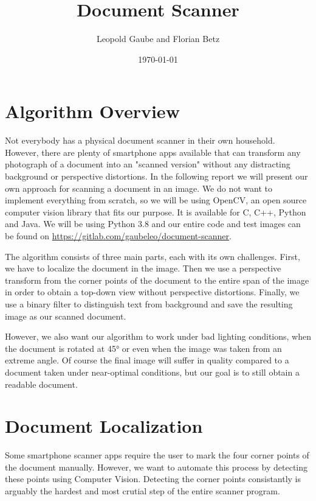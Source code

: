 \documentclass[bibliography=totoc]{scrartcl}
\title{Document Scanner}
\author{Leopold Gaube and Florian Betz}
\date{\today}
\begin{document}
	\maketitle
	\tableofcontents

	\clearpage	

    \section{Algorithm Overview}
	Not everybody has a physical document scanner in their own household. 
	However, there are plenty of smartphone apps available that can transform any photograph of a document into an "scanned version" without any distracting background or perspective distortions.
	In the following report we will present our own approach for scanning a document in an image.
	We do not want to implement everything from scratch, so we will be using \ac{OpenCV}, an open source computer vision library that fits our purpose.
	It is available for C, C++, Python and Java. \cite{OpenCV}
	We will be using Python 3.8 and our entire code and test images can be found on \hyperlink{Gitlab}{https://gitlab.com/gaubeleo/document-scanner}.
	
	The algorithm consists of three main parts, each with its own challenges.
	First, we have to localize the document in the image. 
	Then we use a perspective transform from the corner points of the document to the entire span of the image in order to obtain a top-down view without perspective distortions.
	Finally, we use a binary filter to distinguish text from background and save the resulting image as our scanned document.

	However, we also want our algorithm to work under bad lighting conditions, when the document is rotated at 45° or even when the image was taken from an extreme angle.
	Of course the final image will suffer in quality compared to a document taken under near-optimal conditions, but our goal is to still obtain a readable document.
	
	\section{Document Localization}
	Some smartphone scanner apps require the user to mark the four corner points of the document manually. 
	However, we want to automate this process by detecting these points using Computer Vision.
	Detecting the corner points consistantly is arguably the hardest and most crutial step of the entire scanner program. 
	
\end{document}
